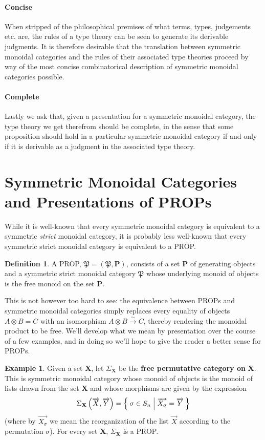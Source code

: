 \documentclass[pra,floatfix,
amsmath,superscriptaddress, 12pt]{article}
\theoremstyle{definition}
\newtheorem{definition}{Definition}
\newtheorem*{example}{Example}
\begin{document}
\paragraph{Concise} When stripped of the philosophical premises of what terms, types, judgements etc. are, the rules of a type theory can be seen to generate its derivable judgments. It is therefore desirable that the translation between symmetric monoidal categories and the rules of their associated type theories proceed by way of the most concise combinatorical description of symmetric monoidal categories possible.

\paragraph{Complete} Lastly we ask that, given a presentation for a symmetric monoidal category, the type theory we get therefrom should be complete, in the sense that some proposition should hold in a particular symmetric monoidal category if and only if it is derivable as a judgment in the associated type theory.

\section{Symmetric Monoidal Categories and Presentations of \textsf{PROP}s}

While it is well-known that every symmetric monoidal category is equivalent
to a symmetric \emph{strict} monoidal category, it is probably less well-known that every symmetric strict monoidal category is equivalent to
a \textsf{PROP}.

\begin{definition} A \textsf{PROP}, $\mathfrak{P}=(\mathfrak{P},\mathbf{P})$, consists of a set $\mathbf{P}$ of generating objects and a symmetric strict monoidal category $\mathfrak{P}$ whose underlying monoid of objects is the free monoid on the set $\mathbf{P}$.
\end{definition}

This is not however too hard to see: the equivalence between \textsf{PROP}s and symmetric monoidal categories simply replaces every equality of objects $A\otimes B = C$ with an isomorphism $A \otimes B \overset{\sim}{\longrightarrow} C$, thereby rendering the monoidal product to be free. We'll develop what we mean by presentation over the course of a few examples, and in doing so we'll hope to give the reader a better sense for \textsf{PROP}s.

\begin{example}
Given a set $\mathbf{X}$, let $\Sigma_{\mathbf{X}}$ be the \textbf{free permutative category on} $\mathbf{X}$. This is symmetric monoidal category whose monoid of objects is the monoid of lists drawn from the set $\mathbf{X}$ and whose morphisms are given by the expression
\[
    \Sigma_{\mathbf{X}}\left(\overrightarrow{X},\overrightarrow{Y}\right)
    =
    \Set{\sigma \in S_{n} | \overrightarrow{X_\sigma}=\overrightarrow{Y}}
\]
(where by $\overrightarrow{X_\sigma}$ we mean the reorganization of the list $\overrightarrow{X}$ according to the permutation $\sigma$). For every set $\mathbf{X}$, $\Sigma_{\mathbf{X}}$ is a \textsf{PROP}.
\end{example}
\end{document}
